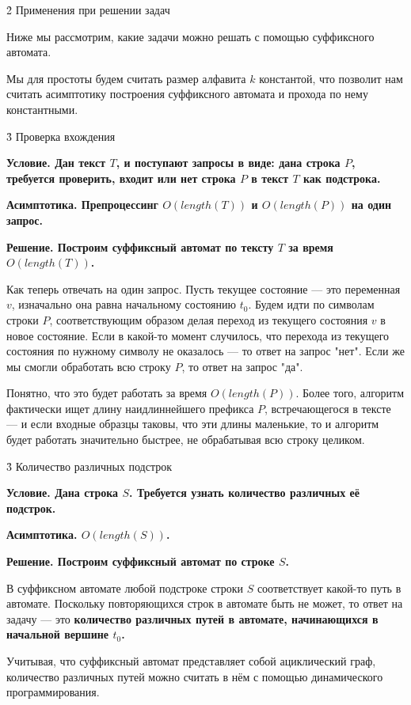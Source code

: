 \h2{ Применения при решении задач }

Ниже мы рассмотрим, какие задачи можно решать с помощью суффиксного автомата.

Мы для простоты будем считать размер алфавита $k$ константой, что позволит нам считать асимптотику построения суффиксного автомата и прохода по нему константными.


\h3{ Проверка вхождения }

\bf{Условие}. Дан текст $T$, и поступают запросы в виде: дана строка $P$, требуется проверить, входит или нет строка $P$ в текст $T$ как подстрока.

\bf{Асимптотика}. Препроцессинг $O (length (T))$ и $O (length (P))$ на один запрос.

\bf{Решение}. Построим суффиксный автомат по тексту $T$ за время $O (length (T))$.

Как теперь отвечать на один запрос. Пусть текущее состояние --- это переменная $v$, изначально она равна начальному состоянию $t_0$. Будем идти по символам строки $P$, соответствующим образом делая переход из текущего состояния $v$ в новое состояние. Если в какой-то момент случилось, что перехода из текущего состояния по нужному символу не оказалось --- то ответ на запрос "нет". Если же мы смогли обработать всю строку $P$, то ответ на запрос "да".

Понятно, что это будет работать за время $O (length (P))$. Более того, алгоритм фактически ищет длину наидлиннейшего префикса $P$, встречающегося в тексте --- и если входные образцы таковы, что эти длины маленькие, то и алгоритм будет работать значительно быстрее, не обрабатывая всю строку целиком.


\h3{ Количество различных подстрок }

\bf{Условие}. Дана строка $S$. Требуется узнать количество различных её подстрок.

\bf{Асимптотика}. $O (length (S))$.

\bf{Решение}. Построим суффиксный автомат по строке $S$.

В суффиксном автомате любой подстроке строки $S$ соответствует какой-то путь в автомате. Поскольку повторяющихся строк в автомате быть не может, то ответ на задачу --- это \bf{количество различных путей} в автомате, начинающихся в начальной вершине $t_0$.

Учитывая, что суффиксный автомат представляет собой ациклический граф, количество различных путей можно считать в нём с помощью динамического программирования.

